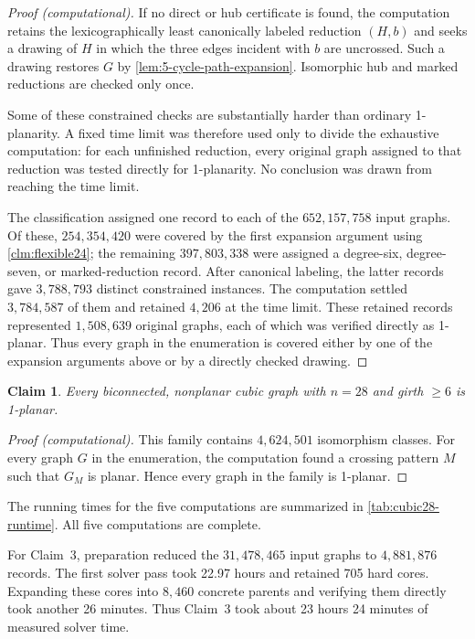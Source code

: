 \documentclass[a4paper,11pt]{article}
\theoremstyle{plain}
\newtheorem{claim}{Claim}
\theoremstyle{definition}  %
\begin{document}
\begin{proof}[Proof (computational)]
    If no direct or hub certificate is found, the computation retains the
    lexicographically least canonically labeled reduction $(H,b)$ and seeks a
    drawing of $H$ in which the three edges incident with $b$ are uncrossed.
    Such a drawing restores $G$ by
    \cref{lem:5-cycle-path-expansion}.  Isomorphic hub and marked reductions
    are checked only once.

    Some of these constrained checks are substantially harder than ordinary
    1-planarity.  A fixed time limit was therefore used only to divide the
    exhaustive computation: for each unfinished reduction, every original
    graph assigned to that reduction was tested directly for 1-planarity.
    No conclusion was drawn from reaching the time limit.

    The classification assigned one record to each of the
    $652{,}157{,}758$ input graphs.  Of these, $254{,}354{,}420$ were covered
    by the first expansion argument using \cref{clm:flexible24}; the remaining
    $397{,}803{,}338$ were assigned a degree-six, degree-seven, or
    marked-reduction record.  After
    canonical labeling, the latter records gave $3{,}788{,}793$ distinct
    constrained instances.  The computation settled $3{,}784{,}587$ of
    them and retained $4{,}206$ at the time limit.  These retained records
    represented $1{,}508{,}639$ original graphs, each of which was verified
    directly as 1-planar.  Thus every graph in the enumeration is covered
    either by one of the expansion arguments above or by a directly checked
    drawing.
\end{proof}

\begin{claim}\label{clm:girth6-28}
    Every biconnected, nonplanar cubic graph with $n=28$ and girth $\geq 6$ is
    1-planar.
\end{claim}

\begin{proof}[Proof (computational)]
    This family contains $4{,}624{,}501$ isomorphism classes.  For every graph
    $G$ in the enumeration, the computation found a crossing pattern $M$ such
    that $G_M$ is planar.  Hence every graph in the family is 1-planar.
\end{proof}

The running times for the five computations are summarized in
\cref{tab:cubic28-runtime}.  All five computations are complete.

For Claim~3, preparation reduced the $31{,}478{,}465$ input graphs to
$4{,}881{,}876$ records.  The first solver pass took 22.97 hours and retained
705 hard cores.  Expanding these cores into $8{,}460$ concrete parents and
verifying them directly took another 26 minutes.  Thus Claim~3 took about
23 hours 24 minutes of measured solver time.
\end{document}
